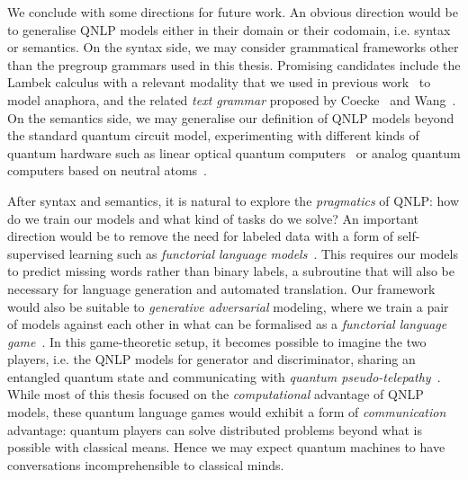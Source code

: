 We conclude with some directions for future work.
An obvious direction would be to generalise QNLP models either in their domain or their codomain, i.e. syntax or semantics.
On the syntax side, we may consider grammatical frameworks other than the pregroup grammars used in this thesis.
Promising candidates include the Lambek calculus with a relevant modality that we used in previous work~\cite{McPheatEtAl21} to model anaphora, and the related \emph{text grammar} proposed by Coecke~\cite{Coecke21} and Wang~\cite{CoeckeWang21}.
On the semantics side, we may generalise our definition of QNLP models beyond the standard quantum circuit model, experimenting with different kinds of quantum hardware such as linear optical quantum computers~\cite{KokEtAl07} or analog quantum computers based on neutral atoms~\cite{HenrietEtAl20}.

After syntax and semantics, it is natural to explore the \emph{pragmatics} of QNLP: how do we train our models and what kind of tasks do we solve?
An important direction would be to remove the need for labeled data with a form of self-supervised learning such as \emph{functorial language models}~\cite{ToumiKoziell-Pipe21}.
This requires our models to predict missing words rather than binary labels, a subroutine that will also be necessary for language generation and automated translation.
Our framework would also be suitable to \emph{generative adversarial} modeling, where we train a pair of models against each other in what can be formalised as a \emph{functorial language game}~\cite{FeliceEtAl20}.
In this game-theoretic setup, it becomes possible to imagine the two players, i.e. the QNLP models for generator and discriminator, sharing an entangled quantum state and communicating with \emph{quantum pseudo-telepathy}~\cite{BrassardEtAl05}.
While most of this thesis focused on the \emph{computational} advantage of QNLP models, these quantum language games would exhibit a form of \emph{communication} advantage: quantum players can solve distributed problems beyond what is possible with classical means.
Hence we may expect quantum machines to have conversations incomprehensible to classical minds.
